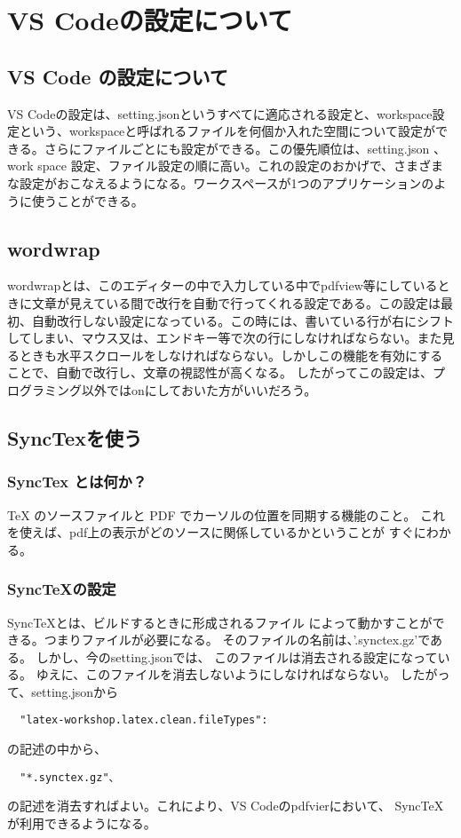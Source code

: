 \documentclass{ltjsarticle}
\begin{document}
\section{VS Codeの設定について}
\subsection{VS Code の設定について}
VS Codeの設定は、setting.jsonというすべてに適応される設定と、workspace設定という、workspaceと呼ばれるファイルを何個か入れた空間について設定ができる。さらにファイルごとにも設定ができる。この優先順位は、setting.json 、work space 設定、ファイル設定の順に高い。これの設定のおかげで、さまざまな設定がおこなえるようになる。ワークスペースが1つのアプリケーションのように使うことができる。
\subsection{wordwrap}
wordwrapとは、このエディターの中で入力している中でpdfview等にしているときに文章が見えている間で改行を自動で行ってくれる設定である。この設定は最初、自動改行しない設定になっている。この時には、書いている行が右にシフトしてしまい、マウス又は、エンドキー等で次の行にしなければならない。また見るときも水平スクロールをしなければならない。しかしこの機能を有効にすることで、自動で改行し、文章の視認性が高くなる。
したがってこの設定は、プログラミング以外ではonにしておいた方がいいだろう。
\subsection{SyncTexを使う}
\subsubsection*{SyncTex とは何か？}
TeX のソースファイルと PDF でカーソルの位置を同期する機能のこと。
これを使えば、pdf上の表示がどのソースに関係しているかということが
すぐにわかる。
\subsubsection*{SyncTeXの設定}
SyncTeXとは、ビルドするときに形成されるファイル
によって動かすことができる。つまりファイルが必要になる。
そのファイルの名前は、'.synctex.gz'である。
しかし、今のsetting.jsonでは、
このファイルは消去される設定になっている。
ゆえに、このファイルを消去しないようにしなければならない。
したがって、setting.jsonから
\begin{verbatim}
  "latex-workshop.latex.clean.fileTypes":
\end{verbatim}
の記述の中から、
\begin{verbatim}
  "*.synctex.gz"、
\end{verbatim}
の記述を消去すればよい。これにより、VS Codeのpdfvierにおいて、
SyncTeXが利用できるようになる。
\end{document}
